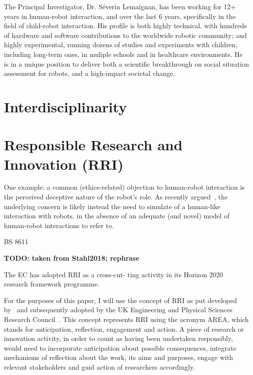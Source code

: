 \documentclass[11pt]{report}
\newcommand{\TODO}[1]{{\color{red}\textbf{TODO: #1}}}
\begin{document}
The Principal Investigator, Dr.  Séverin Lemaignan, has been working for 12+
years in human-robot interaction, and over the last 6 years, specifically in the
field of child-robot interaction.  His profile is both highly technical, with
hundreds of hardware and software contributions to the worldwide robotic
community; and highly experimental, running dozens of studies and experiments
with children, including long-term ones, in muliple schools and in healthcare
environments. He is in a unique position to deliver both a scientific
breakthrough on social situation assessment for robots, and a high-impact
societal change.

\section{Interdisciplinarity}


\section{Responsible Research and Innovation (RRI)}



One example: a common (ethics-related) objection to human-robot interaction is
the perceived deceptive nature of the robot's role. As recently
argued~\cite{biscontilucidi2018companion}, the underlying concern is likely
instead the need to simulate of a human-like interaction with robots, in the
absence of an adequate (and novel) model of human-robot interactions to refer
to.


BS 8611~\cite{bsi2016robots}
~\cite{stahl2018implementing}


\TODO{taken from Stahl2018; rephrase}

The EC has adopted RRI as a cross-cut-
ting activity in its Horizon 2020 research framework programme.

For the purposes of this paper, I will use the concept of RRI as put developed
by~\cite{stilgoe2013developing} and subsequently adopted by the UK Engineering
and Physical Sciences Research Council~\cite{owen2014uk}. This concept
represents RRI using the acronym AREA, which stands for anticipation,
reflection, engagement and action. A piece of research or innovation activity,
in order to count as having been undertaken responsibly, would need to
incorporate anticipation about possible consequences, integrate mechanisms of
reflection about the work, its aims and purposes, engage with relevant
stakeholders and guid action of researchers accordingly.
\end{document}
